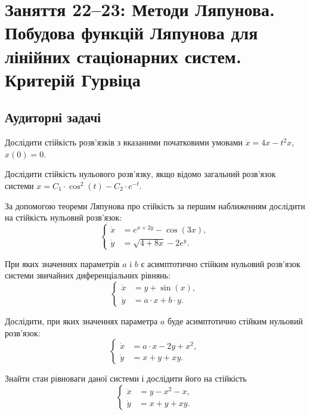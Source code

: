 \section*{Заняття 22--23: Методи Ляпунова. Побудова функцій Ляпунова для лінійних стаціонарних систем. Критерій Гурвіца}

\subsection*{Аудиторні задачі}

\begin{problem}
	Дослідити стійкість розв'язків з вказаними початковими умовами $\dot x = 4 x - t^2 x$, $x(0) = 0$.
\end{problem}

\begin{problem}
	Дослідити стійкість нульового розв'язку, якщо відомо загальний розв'язок системи $x = C_1 \cdot \cos^2 (t) - C_2 \cdot e^{-t}$.
\end{problem}

\begin{problem}
	За допомогою теореми Ляпунова про стійкість за першим наближенням дослідити на стійкість нульовий розв'язок: 
	\[\left\{ \begin{aligned} \dot x &= e^{x + 2 y} - \cos (3 x), \\ \dot y &= \sqrt{4 + 8 x} - 2 e^y. \end{aligned} \right.\]
\end{problem}

\begin{problem}
	При яких значеннях параметрів $a$ i $b$ є асимптотично стійким нульовий розв'язок системи звичайних диференціальних рівнянь: 
	\[\left\{ \begin{aligned} \dot x &= y + \sin (x), \\ \dot y &= a \cdot x + b \cdot y. \end{aligned} \right.\]
\end{problem}

\begin{problem}
	Дослідити, при яких значеннях параметра $a$ буде асимптотично стійким нульовий розв'язок: 
	\[\left\{ \begin{aligned} \dot x &= a \cdot x - 2 y + x^2, \\ \dot y &= x + y + x y. \end{aligned} \right.\]
\end{problem}

\begin{problem}
	Знайти стан рівноваги даної системи і дослідити його на стійкість 
	\[\left\{ \begin{aligned} \dot x &= y - x^2 - x, \\ \dot y &= x + y + x y. \end{aligned} \right.\]
\end{problem}

